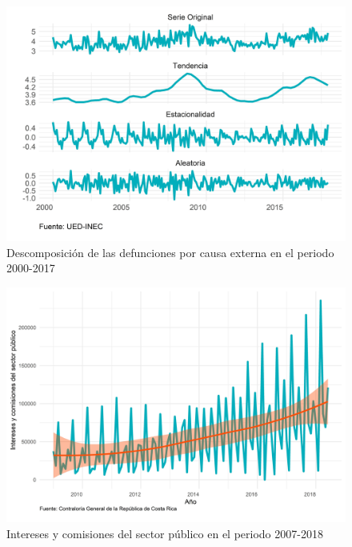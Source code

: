 \documentclass[
]{article}
\begin{document}
\begin{figure}[H]
\includegraphics[width=1\linewidth,height=1\textheight]{Tesis_files/figure-latex/externasplotdescomposicion-1} \caption{Descomposición de las defunciones por causa externa en el periodo 2000-2017}\label{fig:externasplotdescomposicion}
\end{figure}

\begin{figure}[H]
\includegraphics[width=1\linewidth,height=1\textheight]{Tesis_files/figure-latex/interesesplotgeneral-1} \caption{Intereses y comisiones del sector público en el periodo 2007-2018}\label{fig:interesesplotgeneral}
\end{figure}
\end{document}

